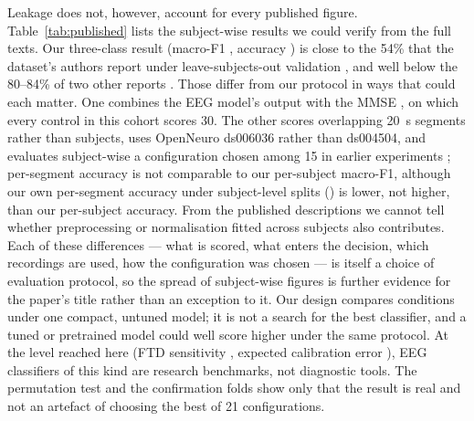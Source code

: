 Leakage does not, however, account for every published figure. Table~\ref{tab:published} lists the
subject-wise results we could verify from the full texts. Our three-class result (macro-F1 \confFOne{},
accuracy \confAcc{}) is close to the 54\% that the dataset's authors report under leave-subjects-out
validation \cite{P_stefanou}, and well below the 80--84\% of two other reports \cite{P_chen,R2}. Those differ
from our protocol in ways that could each matter. One combines the EEG model's output with the MMSE
\cite{P_chen}, on which every control in this cohort scores 30. The other scores overlapping \SI{20}{\second}
segments rather than subjects, uses OpenNeuro ds006036 rather than ds004504, and evaluates subject-wise a
configuration chosen among 15 in earlier experiments \cite{R2}; per-segment accuracy is not comparable to our
per-subject macro-F1, although our own per-segment accuracy under subject-level splits (\confWinAcc{}) is lower,
not higher, than our per-subject accuracy. From the published descriptions we cannot tell whether
preprocessing or normalisation fitted across subjects also contributes. Each of these differences --- what is scored,
what enters the decision, which recordings are used, how the configuration was chosen --- is itself a choice of
evaluation protocol, so the spread of subject-wise figures is further evidence for the paper's title rather
than an exception to it. Our design compares conditions
under one compact, untuned model; it is not a search for the best classifier, and a tuned or pretrained
model could well score higher under the same protocol. At the level reached here (FTD sensitivity
\bestSensFTD{}, expected calibration error \bestEce{}), EEG classifiers of this kind are research benchmarks,
not diagnostic tools. The permutation test and the confirmation folds show only that the result is real and
not an artefact of choosing the best of 21 configurations.

